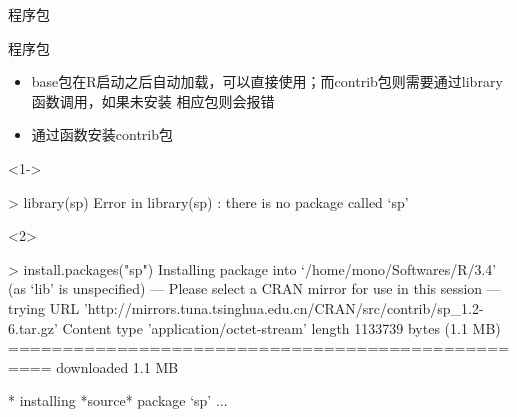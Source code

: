 \documentclass{beamerthemeMono}
\begin{document}
\begin{frame}[t]{\subsecname}{程序包}
\begin{overlayarea}{\textwidth}{\textheight}
\end{overlayarea}
\end{frame}

\begin{frame}[t,fragile]{\subsecname}{程序包}
\begin{itemize}
\item<1-> base包在R启动之后自动加载，可以直接使用；而contrib包则需要通过library函数调用，如果未安装
               相应包则会报错
\item<2-> 通过函数安装contrib包
\end{itemize}

\begin{overlayarea}{\textwidth}{\textheight}
\begin{onlyenv}<1->
\begin{rcode}
> library(sp)
Error in library(sp) : there is no package called ‘sp’
\end{rcode}
\end{onlyenv}

\begin{onlyenv}<2>
\begin{rcode}
> install.packages("sp")
Installing package into ‘/home/mono/Softwares/R/3.4’
(as ‘lib’ is unspecified)
--- Please select a CRAN mirror for use in this session ---
trying URL 'http://mirrors.tuna.tsinghua.edu.cn/CRAN/src/contrib/sp_1.2-6.tar.gz'
Content type 'application/octet-stream' length 1133739 bytes (1.1 MB)
==================================================
downloaded 1.1 MB

* installing *source* package ‘sp’ ...
\end{rcode}
\end{onlyenv}
\end{overlayarea}
\end{frame}
\end{document}
